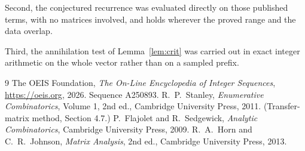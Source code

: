 \documentclass[11pt,a4paper]{article}
\theoremstyle{plain}
\theoremstyle{definition}
\begin{document}
Second, the conjectured recurrence was evaluated directly on those published terms, with no
matrices involved, and holds wherever the proved range and the data overlap.

Third, the annihilation test of Lemma~\ref{lem:crit} was carried out in exact integer
arithmetic on the whole vector rather than on a sampled prefix.

\begin{thebibliography}{9}
 The OEIS Foundation, \emph{The On-Line Encyclopedia of Integer
Sequences}, \url{https://oeis.org}, 2026. Sequence A250893.
 R.~P.~Stanley, \emph{Enumerative Combinatorics}, Volume 1, 2nd ed.,
Cambridge University Press, 2011. (Transfer-matrix method, Section 4.7.)
 P.~Flajolet and R.~Sedgewick, \emph{Analytic Combinatorics}, Cambridge
University Press, 2009.
 R.~A.~Horn and C.~R.~Johnson, \emph{Matrix Analysis}, 2nd ed., Cambridge
University Press, 2013.
\end{thebibliography}
\end{document}
